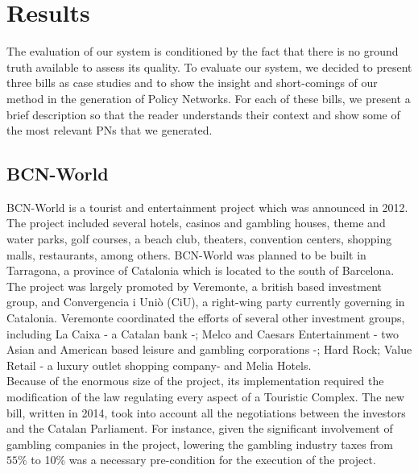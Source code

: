 \section{Results}\label{sec:results}

The evaluation of our system is conditioned by the fact that there is no ground truth available to assess its quality. To evaluate our system, we decided to present three bills as case studies and to show the insight and short-comings of our method in the generation of Policy Networks. For each of these bills, we present a brief description so that the reader understands their context and show some of the most relevant PNs that we generated. 

\subsection{BCN-World}\label{subsec:bcn_world}

BCN-World is a tourist and entertainment project which was announced in 2012. The project included several hotels, casinos and gambling houses, theme and water parks, golf courses, a beach club, theaters, convention centers, shopping malls, restaurants, among others. BCN-World was planned to be built in Tarragona, a province of Catalonia which is located to the south of Barcelona. \\

The project was largely promoted by Veremonte, a british based investment group, and Convergencia i Uni\`o (CiU), a right-wing party currently governing in Catalonia. Veremonte coordinated the efforts of several other investment groups, including La Caixa - a Catalan bank -; Melco and Caesars Entertainment - two Asian and American based leisure and gambling corporations -; Hard Rock; Value Retail - a luxury outlet shopping company- and Melia Hotels. \\  

Because of the enormous size of the project, its implementation required the modification of the law regulating every aspect of a Touristic Complex. The new bill, written in 2014, took into account all the negotiations between the investors and the Catalan Parliament. For instance, given the significant involvement of gambling companies in the project, lowering the gambling industry taxes from $55\%$ to 10\% was a necessary pre-condition for the execution of the project. \\


